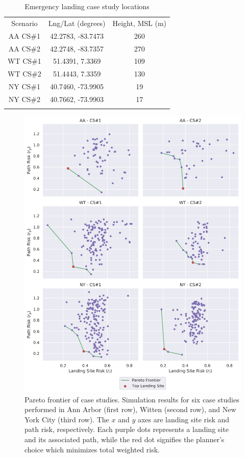 \begin{table}[ht]
\centering
\caption[Emergency landing case study locations]{Emergency landing case study locations}
\label{table:ch5_case_studies}
\begin{tabular}{c@{\qquad}c@{\qquad}c}
\hline\noalign{\smallskip}
Scenario   & Lng/Lat (degrees)        & Height, MSL (m)  \\
\noalign{\smallskip}\hline\noalign{\smallskip}
AA CS\#1    & 42.2783, -83.7473  & 260          \\
AA CS\#2    & 42.2748, -83.7357   & 270          \\
WT CS\#1    & 51.4391, 7.3369   & 109          \\
WT CS\#2    & 51.4443, 7.3359   & 130          \\
NY CS\#1    & 40.7460, -73.9905   & 19         \\
NY CS\#2    & 40.7662, -73.9903   & 17         \\
\noalign{\smallskip}\hline\noalign{\smallskip}
\end{tabular}
\end{table}

\begin{figure}[t]
    \centering
    \includegraphics[clip, trim=0.2cm 0cm 0cm 0cm, width=.80\linewidth]{chapter_5_mapping/imgs/all_pareto.pdf}
    \caption[Pareto frontier of case studies]{Pareto frontier of case studies. Simulation results for six case studies performed in Ann Arbor (first row), Witten (second row), and New York City (third row). The $x$ and $y$ axes are landing site risk and path risk, respectively. Each purple dots represents a landing site and its associated path, while the red dot signifies the planner's choice which minimizes total weighted risk.}
    \label{fig:ch5_all_pareto_plots}
\end{figure}

